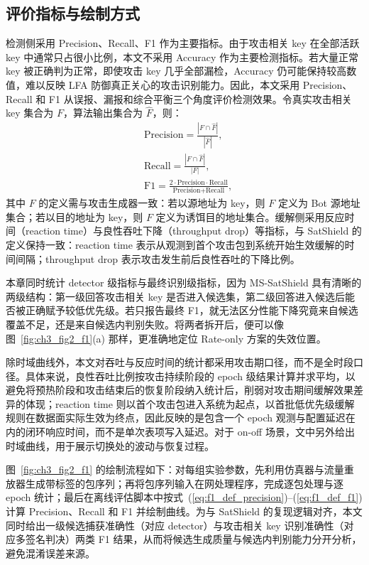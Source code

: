 \subsection{评价指标与绘制方式}
检测侧采用 Precision、Recall、F1 作为主要指标。由于攻击相关 key 在全部活跃 key 中通常只占很小比例，本文不采用 Accuracy 作为主要检测指标。若大量正常 key 被正确判为正常，即使攻击 key 几乎全部漏检，Accuracy 仍可能保持较高数值，难以反映 LFA 防御真正关心的攻击识别能力。因此，本文采用 Precision、Recall 和 F1 从误报、漏报和综合平衡三个角度评价检测效果。令真实攻击相关 key 集合为 $F$，算法输出集合为 $\widehat{F}$，则：
\begin{subequations}\label{eq:f1_def}
\begin{align}
&\text{Precision} = \frac{|F\cap \widehat{F}|}{|\widehat{F}|},
\label{eq:f1_def_precision}\\[0.35em]
&\text{Recall} = \frac{|F\cap \widehat{F}|}{|F|},
\label{eq:f1_def_recall}\\[0.35em]
&\text{F1} = \frac{2\cdot \text{Precision}\cdot \text{Recall}}{\text{Precision}+\text{Recall}},
\label{eq:f1_def_f1}
\end{align}
\end{subequations}
其中 $F$ 的定义需与攻击生成器一致：若以源地址为 key，则 $F$ 定义为 Bot 源地址集合；若以目的地址为 key，则 $F$ 定义为诱饵目的地址集合。缓解侧采用反应时间（reaction time）与良性吞吐下降（throughput drop）等指标，与 SatShield 的定义保持一致：reaction time 表示从观测到首个攻击包到系统开始生效缓解的时间间隔；throughput drop 表示攻击发生前后良性吞吐的下降比例。


本章同时统计 detector 级指标与最终识别级指标，因为 MS-SatShield 具有清晰的两级结构：第一级回答攻击相关 key 是否进入候选集，第二级回答进入候选后能否被正确赋予较低优先级。若只报告最终 F1，就无法区分性能下降究竟来自候选覆盖不足，还是来自候选内判别失败。将两者拆开后，便可以像图~\ref{fig:ch3_fig2_f1}(a) 那样，更准确地定位 Rate-only 方案的失效位置。

除时域曲线外，本文对吞吐与反应时间的统计都采用攻击期口径，而不是全时段口径。具体来说，良性吞吐比例按攻击持续阶段的 epoch 级结果计算并求平均，以避免将预热阶段和攻击结束后的恢复阶段纳入统计后，削弱对攻击期间缓解效果差异的体现；reaction time 则以首个攻击包进入系统为起点，以首批低优先级缓解规则在数据面实际生效为终点，因此反映的是包含一个 epoch 观测与配置延迟在内的闭环响应时间，而不是单次表项写入延迟。对于 on-off 场景，文中另外给出时域曲线，用于展示切换处的波动与恢复过程。

图~\ref{fig:ch3_fig2_f1} 的绘制流程如下：对每组实验参数，先利用仿真器与流量重放器生成带标签的包序列；再将包序列输入在网处理程序，完成逐包处理与逐 epoch 统计；最后在离线评估脚本中按式~(\ref{eq:f1_def_precision})--(\ref{eq:f1_def_f1}) 计算 Precision、Recall 和 F1 并绘制曲线。为与 SatShield 的复现逻辑对齐，本文同时给出一级候选捕获准确性（对应 detector）与攻击相关 key 识别准确性（对应多签名判决）两类 F1 结果，从而将候选生成质量与候选内判别能力分开分析，避免混淆误差来源。

